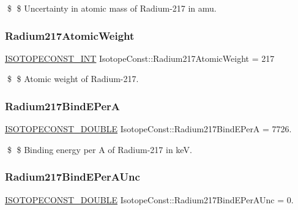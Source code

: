 \$ \$ Uncertainty in atomic mass of Radium-\/217 in amu. \mbox{\label{group___isotope_const-_radium-_ra217_ga1380490fd5b628c757795d0811f3ea97}} 
\subsubsection{\texorpdfstring{Radium217\+Atomic\+Weight}{Radium217AtomicWeight}}
{\footnotesize\ttfamily \mbox{\hyperlink{group___isotope_const-_macros_ga5f18360b3e99483a35c32d789e62621c}{I\+S\+O\+T\+O\+P\+E\+C\+O\+N\+S\+T\+\_\+\+I\+NT}} Isotope\+Const\+::\+Radium217\+Atomic\+Weight = 217}

\$ \$ Atomic weight of Radium-\/217. \mbox{\label{group___isotope_const-_radium-_ra217_ga5d0933bd197cacff4f95e8884d85afed}} 
\subsubsection{\texorpdfstring{Radium217\+Bind\+E\+PerA}{Radium217BindEPerA}}
{\footnotesize\ttfamily \mbox{\hyperlink{group___isotope_const-_macros_ga8f45a7272ce02c0b4c65c44636ed719a}{I\+S\+O\+T\+O\+P\+E\+C\+O\+N\+S\+T\+\_\+\+D\+O\+U\+B\+LE}} Isotope\+Const\+::\+Radium217\+Bind\+E\+PerA = 7726.}

\$ \$ Binding energy per A of Radium-\/217 in keV. \mbox{\label{group___isotope_const-_radium-_ra217_gaa24e3b3a67a688608203af239eab61b8}} 
\subsubsection{\texorpdfstring{Radium217\+Bind\+E\+Per\+A\+Unc}{Radium217BindEPerAUnc}}
{\footnotesize\ttfamily \mbox{\hyperlink{group___isotope_const-_macros_ga8f45a7272ce02c0b4c65c44636ed719a}{I\+S\+O\+T\+O\+P\+E\+C\+O\+N\+S\+T\+\_\+\+D\+O\+U\+B\+LE}} Isotope\+Const\+::\+Radium217\+Bind\+E\+Per\+A\+Unc = 0.}

